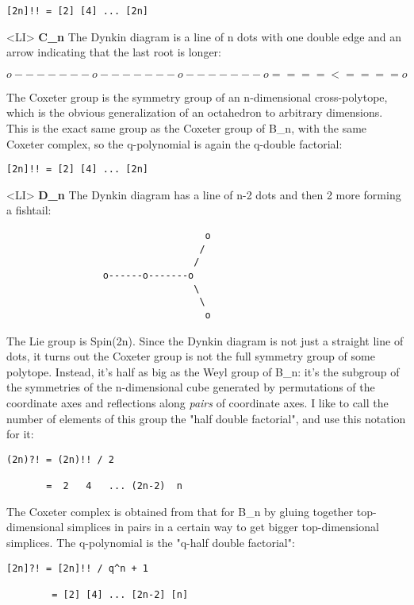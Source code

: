 \begin{verbatim}
[2n]!! = [2] [4] ... [2n]
\end{verbatim}
    
<LI>
\textbf{C_{n}}
The Dynkin diagram is a line of n dots with one double edge
and an arrow indicating that the last root is longer:

$$
                 o-------o-------o-------o====<====o 
$$
    
The Coxeter group is the symmetry group of an n-dimensional cross-polytope,
which is the obvious generalization of an octahedron to arbitrary
dimensions.  This is the exact same group as the Coxeter group of B_{n},
with the same Coxeter complex, so the q-polynomial is again the q-double
factorial:

\begin{verbatim}
[2n]!! = [2] [4] ... [2n]
\end{verbatim}
    
<LI>
\textbf{D_{n}}  The Dynkin diagram has a line of n-2 dots and then 2 more
forming a fishtail:
   
\begin{verbatim}
                                   o 
                                  /
                                 /
                 o------o-------o 
                                 \
                                  \
                                   o
\end{verbatim}
    
The Lie group is Spin(2n).  Since the Dynkin diagram is not just a
straight line of dots, it turns out the Coxeter group is not the full
symmetry group of some polytope.  Instead, it's half as big as the Weyl
group of B_{n}: it's the subgroup of the symmetries of the
n-dimensional cube generated by permutations of the coordinate axes and
reflections along \emph{pairs} of coordinate axes.  I like to call the number
of elements of this group the "half double factorial", and use
this notation for it:

\begin{verbatim}
(2n)?! = (2n)!! / 2

       =  2   4   ... (2n-2)  n
\end{verbatim}
    
The Coxeter complex is obtained from that for B_{n} by gluing together
top-dimensional simplices in pairs in a certain way to get bigger
top-dimensional simplices.  The q-polynomial is the "q-half double 
factorial":

\begin{verbatim}
[2n]?! = [2n]!! / q^n + 1

        = [2] [4] ... [2n-2] [n]
\end{verbatim}
    

